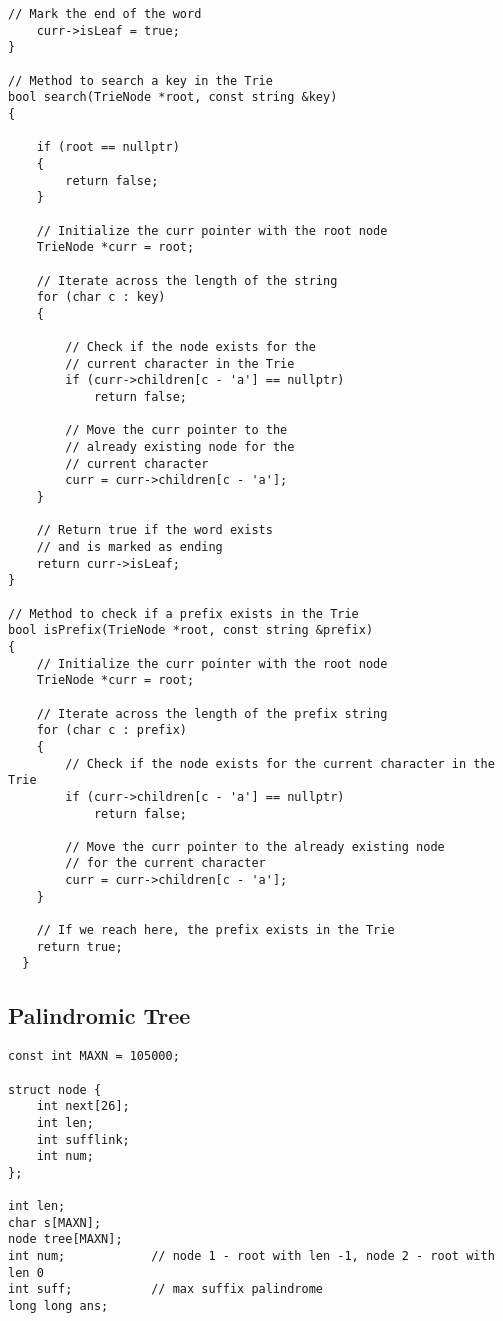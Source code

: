 \documentclass[10pt]{article}
\begin{document}
\begin{multicols*}{2}
\begin{lstlisting}[style=compactcpp]
    // Mark the end of the word
    curr->isLeaf = true;
}

// Method to search a key in the Trie
bool search(TrieNode *root, const string &key)
{

    if (root == nullptr)
    {
        return false;
    }

    // Initialize the curr pointer with the root node
    TrieNode *curr = root;

    // Iterate across the length of the string
    for (char c : key)
    {

        // Check if the node exists for the
        // current character in the Trie
        if (curr->children[c - 'a'] == nullptr)
            return false;

        // Move the curr pointer to the
        // already existing node for the
        // current character
        curr = curr->children[c - 'a'];
    }

    // Return true if the word exists
    // and is marked as ending
    return curr->isLeaf;
}

// Method to check if a prefix exists in the Trie
bool isPrefix(TrieNode *root, const string &prefix)
{
    // Initialize the curr pointer with the root node
    TrieNode *curr = root;

    // Iterate across the length of the prefix string
    for (char c : prefix)
    {
        // Check if the node exists for the current character in the Trie
        if (curr->children[c - 'a'] == nullptr)
            return false;

        // Move the curr pointer to the already existing node
        // for the current character
        curr = curr->children[c - 'a'];
    }

    // If we reach here, the prefix exists in the Trie
    return true;
  }
\end{lstlisting}

\subsection{Palindromic Tree}

\begin{lstlisting}[style=compactcpp]
const int MAXN = 105000;

struct node {
    int next[26];
    int len;
    int sufflink;
    int num;
};

int len;
char s[MAXN];
node tree[MAXN]; 
int num;            // node 1 - root with len -1, node 2 - root with len 0
int suff;           // max suffix palindrome
long long ans;


\end{lstlisting}
\end{multicols*}
\end{document}
